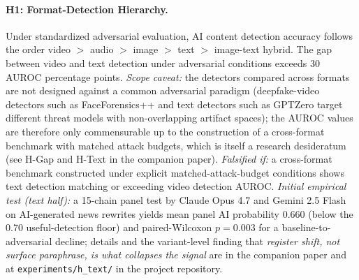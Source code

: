 \documentclass[12pt]{article}
\begin{document}
\paragraph{H1: Format-Detection Hierarchy.} Under standardized adversarial evaluation, AI content detection accuracy follows the order video $>$ audio $>$ image $>$ text $>$ image-text hybrid. The gap between video and text detection under adversarial conditions exceeds 30 AUROC percentage points. \textit{Scope caveat:} the detectors compared across formats are not designed against a common adversarial paradigm (deepfake-video detectors such as FaceForensics++ and text detectors such as GPTZero target different threat models with non-overlapping artifact spaces); the AUROC values are therefore only commensurable up to the construction of a cross-format benchmark with matched attack budgets, which is itself a research desideratum (see H-Gap and H-Text in the companion paper). \textit{Falsified if:} a cross-format benchmark constructed under explicit matched-attack-budget conditions shows text detection matching or exceeding video detection AUROC. \textit{Initial empirical test (text half):} a 15-chain panel test by Claude Opus 4.7 and Gemini 2.5 Flash on AI-generated news rewrites yields mean panel AI probability 0.660 (below the 0.70 useful-detection floor) and paired-Wilcoxon $p = 0.003$ for a baseline-to-adversarial decline; details and the variant-level finding that \emph{register shift, not surface paraphrase, is what collapses the signal} are in the companion paper \cite{author2026amsm} and at \texttt{experiments/h\_text/} in the project repository.
\end{document}

